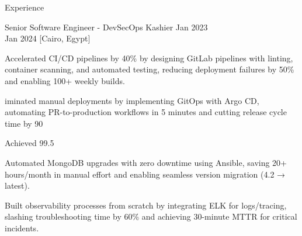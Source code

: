 \begin{rSection}{Experience}
    \begin{rSubsection}
        {Senior Software Engineer - DevSecOps}
        {Kashier}
        {Jan 2023 \\ Jan 2024}
        [Cairo, Egypt]
        \begin{rItemize}
            \item Accelerated CI/CD pipelines by 40\% by designing GitLab pipelines with linting, container scanning, and automated testing, reducing deployment failures by 50\% and enabling 100+ weekly builds.
            \item iminated manual deployments by implementing GitOps with Argo CD, automating PR-to-production workflows in 5 minutes and cutting release cycle time by 90%
            \item Achieved 99.5%
            \item Automated MongoDB upgrades with zero downtime using Ansible, saving 20+ hours/month in manual effort and enabling seamless version migration (4.2 → latest).
            \item Built observability processes from scratch by integrating ELK for logs/tracing, slashing troubleshooting time by 60\% and achieving 30-minute MTTR for critical incidents.
        \end{rItemize}
    \end{rSubsection}


\end{rSection}
